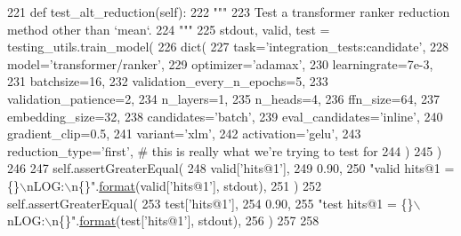 \begin{DoxyCode}
221     \textcolor{keyword}{def }test\_alt\_reduction(self):
222         \textcolor{stringliteral}{"""}
223 \textcolor{stringliteral}{        Test a transformer ranker reduction method other than `mean`.}
224 \textcolor{stringliteral}{        """}
225         stdout, valid, test = testing\_utils.train\_model(
226             dict(
227                 task=\textcolor{stringliteral}{'integration\_tests:candidate'},
228                 model=\textcolor{stringliteral}{'transformer/ranker'},
229                 optimizer=\textcolor{stringliteral}{'adamax'},
230                 learningrate=7e-3,
231                 batchsize=16,
232                 validation\_every\_n\_epochs=5,
233                 validation\_patience=2,
234                 n\_layers=1,
235                 n\_heads=4,
236                 ffn\_size=64,
237                 embedding\_size=32,
238                 candidates=\textcolor{stringliteral}{'batch'},
239                 eval\_candidates=\textcolor{stringliteral}{'inline'},
240                 gradient\_clip=0.5,
241                 variant=\textcolor{stringliteral}{'xlm'},
242                 activation=\textcolor{stringliteral}{'gelu'},
243                 reduction\_type=\textcolor{stringliteral}{'first'},  \textcolor{comment}{# this is really what we're trying to test for}
244             )
245         )
246 
247         self.assertGreaterEqual(
248             valid[\textcolor{stringliteral}{'hits@1'}],
249             0.90,
250             \textcolor{stringliteral}{"valid hits@1 = \{\}\(\backslash\)nLOG:\(\backslash\)n\{\}"}.\hyperlink{namespaceparlai_1_1chat__service_1_1services_1_1messenger_1_1shared__utils_a32e2e2022b824fbaf80c747160b52a76}{format}(valid[\textcolor{stringliteral}{'hits@1'}], stdout),
251         )
252         self.assertGreaterEqual(
253             test[\textcolor{stringliteral}{'hits@1'}],
254             0.90,
255             \textcolor{stringliteral}{"test hits@1 = \{\}\(\backslash\)nLOG:\(\backslash\)n\{\}"}.\hyperlink{namespaceparlai_1_1chat__service_1_1services_1_1messenger_1_1shared__utils_a32e2e2022b824fbaf80c747160b52a76}{format}(test[\textcolor{stringliteral}{'hits@1'}], stdout),
256         )
257 
258 
\end{DoxyCode}
\mbox{\label{classtests_1_1test__transformers_1_1TestTransformerRanker_a63dd66de96a7eee38a2bf477bd27441f}} 
